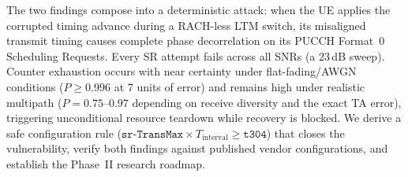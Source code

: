 {The two findings compose into a deterministic attack: when the UE applies the corrupted timing advance
during a RACH-less LTM switch, its misaligned transmit timing causes complete phase decorrelation on its
PUCCH Format~0 Scheduling Requests. Every SR attempt fails across all SNRs (a 23\,dB sweep). Counter
exhaustion occurs with near certainty under flat-fading/AWGN conditions ($P \ge 0.996$ at 7 units of
error) and remains high under realistic multipath ($P = 0.75$--$0.97$ depending on receive diversity and
the exact TA error), triggering unconditional resource teardown while recovery is blocked. We derive a
safe configuration rule ($\texttt{sr-TransMax} \times T_{\text{interval}}
\ge \texttt{t304}$) that closes the vulnerability, verify both findings against published vendor
configurations, and establish the Phase~II research roadmap.
}
